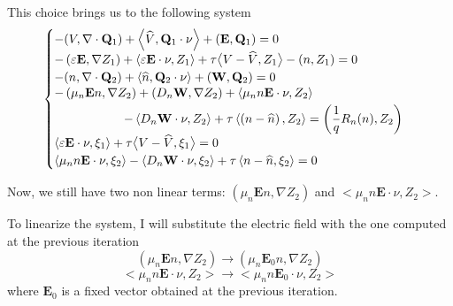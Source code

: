 \documentclass[a4paper,12pt, draft]{article}
\newcommand{\diver}[1]{\ensuremath{\nabla \cdot #1}}
\begin{document}
This choice brings us to the following system
\begin{equation} \label{eq:formulation1nonlinear}
 \begin{cases}
  -(V, \diver{\mathbf{Q}_{1}}) + \left<\widehat{V}, \mathbf{Q}_{1} \cdot \nu \right> +
      \left(\mathbf{E}, \mathbf{Q}_{1} \right) = 0 \\
  - \left(\varepsilon \mathbf{E}, \nabla Z_{1}\right) + \left<\varepsilon \mathbf{E} \cdot \nu,
       Z_{1}\right> + \tau \big< V - \widehat{V}, Z_{1} \big> - (n, Z_{1}) = 0 \\
  -(n, \diver{\mathbf{Q}_{2}}) + \left<\widehat{n}, \mathbf{Q}_{2} \cdot \nu \right> +
      \left(\mathbf{W}, \mathbf{Q}_{2} \right) = 0 \\
  \begin{aligned}
  - \left(\mu_n \mathbf{E} n, \nabla Z_{2} \right) + \left( D_n \mathbf{W}, \nabla Z_{2} \right) +
      \left<\mu_n n \mathbf{E} \cdot \nu, Z_{2} \right> \hphantom{- \left< D_n \mathbf{W} \cdot \nu,
      Z_{2} \right> } \\
      - \left< D_n \mathbf{W} \cdot \nu, Z_{2} \right> + \tau \left< \left(n -
         \widehat{n}\right), Z_{2} \right>  =
      \left(\frac{1}{q}R_n(n), Z_2\right)
  \end{aligned} \\
   \left<\varepsilon \mathbf{E} \cdot \nu, \xi_{1}\right> + \tau \big< V - \widehat{V}, \xi_{1}
       \big> = 0 \\
  \left<\mu_n n \mathbf{E} \cdot \nu, \xi_{2} \right> - \left<D_n \mathbf{W} \cdot \nu, \xi_{2}
       \right> + \tau \left< n - \widehat{n}, \xi_{2} \right> = 0
 \end{cases}
\end{equation}

Now, we still have two non linear terms: $(\mu_n \mathbf{E} n, \nabla Z_{2})$ and
$<\mu_n n \mathbf{E} \cdot \nu, Z_{2}>$.

To linearize the system, I will substitute the electric field with the one computed at the previous
iteration
\[  \left(\mu_n \mathbf{E} n, \nabla Z_{2} \right) \rightarrow \left(\mu_n \mathbf{E}_{0} n, \nabla
Z_{2} \right) \]
\[ <\mu_n n \mathbf{E} \cdot \nu, Z_{2}> \rightarrow <\mu_n n \mathbf{E}_{0} \cdot \nu, Z_{2}>\]
where $\mathbf{E}_0$ is a fixed vector obtained at the previous iteration.
\end{document}

